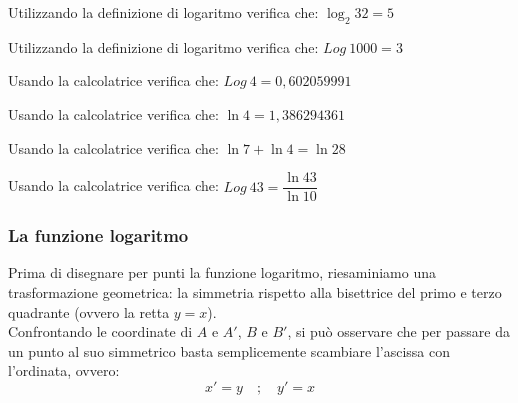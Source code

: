 \begin{esempio}
 Utilizzando la definizione di logaritmo verifica che: \(\log_2 32 = 5\)
\end{esempio}

\begin{esempio}
 Utilizzando la definizione di logaritmo verifica che: \(Log~1000 = 3\)
\end{esempio}

\begin{esempio}
 Usando la calcolatrice verifica che: \(Log~4 = 0,602059991\)
\end{esempio}

\begin{esempio}
 Usando la calcolatrice verifica che: \(\ln 4 = 1,386294361\)
\end{esempio}

\begin{esempio}
 Usando la calcolatrice verifica che: \(\ln 7 + \ln 4 = \ln 28\)
\end{esempio}

\begin{esempio}
 Usando la calcolatrice verifica che: \(Log~43 = \dfrac{\ln 43}{\ln 10}\)
\end{esempio}

\subsubsection{La funzione logaritmo}
\label{subsubsec:esplog_funzione_logaritmo}
\noindent
\begin{minipage}[]{.60\textwidth}
Prima di disegnare per punti la funzione logaritmo, riesaminiamo una 
trasformazione geometrica: la simmetria rispetto alla bisettrice del primo 
e terzo quadrante (ovvero
la retta \(y=x\)).\\[7pt]
Confrontando le coordinate di \(A\) e \(A'\), \(B\) e \(B'\), si può 
osservare che per 
passare da un punto al suo simmetrico basta semplicemente scambiare 
l'ascissa 
con l'ordinata, ovvero:
\[ x'=y \quad ; \quad  y'=x\]


\end{minipage} \hspace{.04\textwidth}
\begin{minipage}[]{.35\textwidth}
\begin{center}
\begin{inaccessibleblock}
  \simmetriayx
\end{inaccessibleblock}
\end{center}
\end{minipage} 

